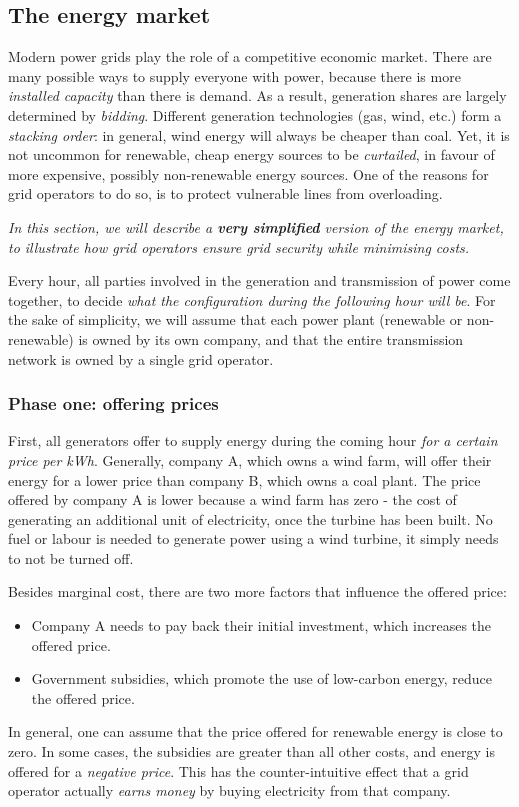 \documentclass[main.tex]{subfiles}
\begin{document}


\clearpage
\subsection{The energy market}
Modern power grids play the role of a competitive economic market. There are many possible ways to supply everyone with power, because there is more \emph{installed capacity} than there is demand. As a result, generation shares are largely determined by \emph{bidding}. Different generation technologies (gas, wind, etc.) form a \emph{stacking order}: in general, wind energy will always be cheaper than coal. Yet, it is not uncommon for renewable, cheap energy sources to be \emph{curtailed}, in favour of more expensive, possibly non-renewable energy sources. One of the reasons for grid operators to do so, is to protect vulnerable lines from overloading. 

\emph{In this section, we will describe a \textbf{very simplified} version of the energy market, to illustrate how grid operators ensure \emph{grid security} while minimising costs.}

Every hour, all parties involved in the generation and transmission of power come together, to decide \emph{what the configuration during the following hour will be}. For the sake of simplicity, we will assume that each power plant (renewable or non-renewable) is owned by its own company, and that the entire transmission network is owned by a single grid operator.

\subsubsection*{Phase one: offering prices}
First, all generators offer to supply energy during the coming hour \emph{for a certain price per kWh}. Generally, company A, which owns a wind farm, will offer their energy for a lower price than company B, which owns a coal plant. The price offered by company A is lower because a wind farm has zero  - the cost of generating an additional unit of electricity, once the turbine has been built. No fuel or labour is needed to generate power using a wind turbine, it simply needs to not be turned off.

Besides marginal cost, there are two more factors that influence the offered price:
\begin{itemize}[itemsep=0em]
    \item Company A needs to pay back their initial investment, which increases the offered price.
    \item Government subsidies, which promote the use of low-carbon energy, reduce the offered price.
\end{itemize}
In general, one can assume that the price offered for renewable energy is close to zero. In some cases, the subsidies are greater than all other costs, and energy is offered for a \emph{negative price}. This has the counter-intuitive effect that a grid operator actually \emph{earns money} by buying electricity from that company.
\end{document}
